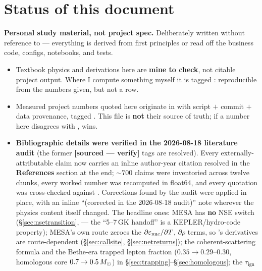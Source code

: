 \section*{Status of this document}
\label{sec:status}

\begin{warn}
\textbf{Personal study material, not project spec.} Deliberately written without
reference to  --- everything is derived from first principles or
read off the business code, configs, notebooks, and tests.
\end{warn}

\begin{itemize}
\item Textbook physics and derivations here are \textbf{mine to check}, not
  citable project output. Where I compute something myself it is tagged
  \derivedhere: reproducible from the numbers given, but not a
   row.
\item Measured project numbers quoted here originate in  with
  script $+$ commit $+$ data provenance, tagged \resultsref{}. This file is
  \textbf{not} their source of truth; if a number here disagrees with
  ,  wins.
\item \textbf{Bibliographic details were verified in the 2026-08-18 literature
  audit} (the former \textbf{[sourced --- verify]} tags are resolved). Every
  externally-attributable claim now carries an inline author-year citation
  resolved in the \textbf{References} section at the end; ${\sim}700$ claims
  were inventoried across twelve chunks, every worked number was recomputed in
  float64, and every \code{[RESULTS]} quotation was cross-checked against
  . Corrections found by the audit were applied in place, with
  an inline ``(corrected in the 2026-08-18 audit)'' note wherever the physics
  content itself changed. The headline ones: MESA has \textbf{no} NSE switch
  (\S\ref{sec:nsetransition},  --- the ``5--7\,GK handoff'' is a
  KEPLER/hydro-code property); MESA's own  route zeroes
  the $\partial\varepsilon_{\mathrm{nuc}}/\partial T$, $\partial\rho$ terms, so 's
  derivatives are route-dependent (\S\ref{sec:callsite}, \S\ref{sec:netreturns});
  the coherent-scattering formula and the Bethe-era trapped lepton fraction
  ($0.35 \to 0.29$--$0.30$, homologous core $0.7 \to 0.5\,M_{\odot}$) in
  \S\ref{sec:trapping}--\S\ref{sec:homologous}; the $\tau_{\mathrm{ign}}$

\end{itemize}
